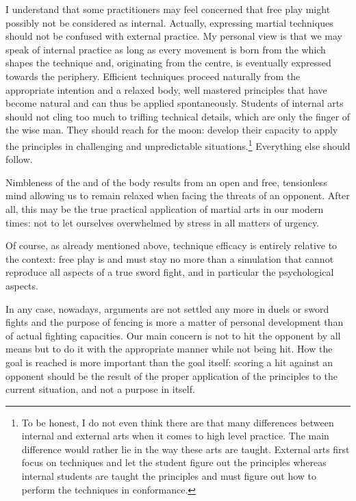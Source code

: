 I understand that some practitioners may feel concerned that free play might possibly not be considered as internal.
Actually, expressing martial techniques should not be confused with external practice. 
My personal view is that we may speak of internal practice as long as every movement is born from the \Yi{} which shapes the technique and, originating from the centre, is eventually expressed towards the periphery. Efficient techniques proceed naturally from the appropriate intention and a relaxed body, well mastered principles that have become natural and can thus be applied spontaneously.
Students of internal arts should not cling too much to trifling technical details, which are only the finger of the wise man. 
They should reach for the moon: develop their capacity to apply the principles in challenging and unpredictable situations.\footnote{To be honest, I do not even think there are that many differences between internal and external arts when it comes to high level practice. The main difference would rather lie in the way these arts are taught. External arts first focus on techniques and let the student figure out the principles whereas internal students are taught the principles and must figure out how to perform the techniques in conformance.} Everything else should follow.

Nimbleness of the \Yi{} and of the body results from an open and free, tensionless mind allowing us to remain relaxed when facing the threats of an opponent.
After all, this may be the true practical application of martial arts in our modern times: not to let ourselves overwhelmed by stress in all matters of urgency.

Of course, as already mentioned above, technique efficacy is entirely relative to the context: free play is \textendash{} and must stay \textendash{} no more than a simulation that cannot reproduce all aspects of a true sword fight, and in particular the psychological aspects.

In any case, nowadays, arguments are not settled any more in duels or sword fights and the purpose of \Taiji{} fencing is more a matter of personal development than of actual fighting capacities. Our main concern is not to hit the opponent by all means but to do it with the appropriate manner while not being hit. How the goal is reached is more important than the goal itself: scoring a hit against an opponent should be the result of the proper application of the \Taiji{} principles to the current situation, and not a purpose in itself.

